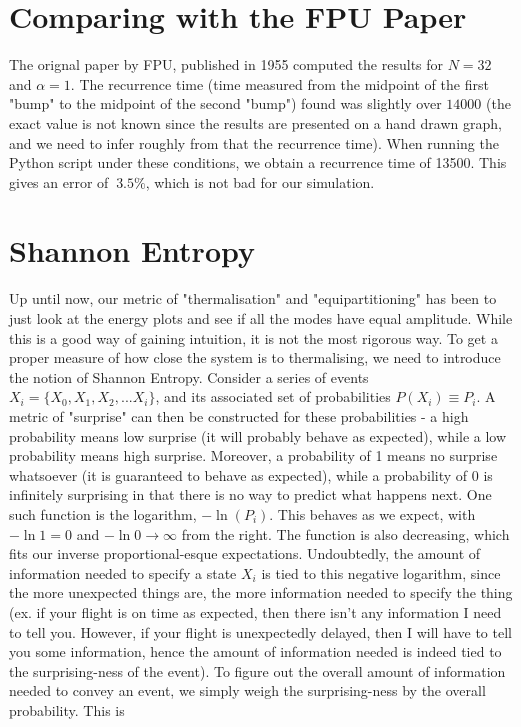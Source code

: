 \documentclass{article}
\begin{document}
\section{Comparing with the FPU Paper}
The orignal paper by FPU, published in 1955 computed the results for 
$N=32$ and $\alpha=1$. The recurrence time (time measured from the midpoint of 
the first "bump" to the midpoint of the second "bump") found was slightly over 
$14000$ (the exact value is not known since the results are presented
 on a hand drawn graph, and we need to infer roughly from that the recurrence time). When running the Python script 
under these conditions, we obtain a recurrence time of 13500. This gives an error of 
$~3.5\%$, 
which is not bad for our simulation. 
\section{Shannon Entropy}
Up until now, our metric of "thermalisation" and "equipartitioning" has been to just 
look at the energy plots and see if all the modes have equal amplitude. While this 
is a good way of gaining intuition, it is not the most rigorous way. To get a proper measure of how close the system is to thermalising, we need to introduce the notion 
of Shannon Entropy. Consider a series of events $X_i=\{X_0,X_1,X_2,...X_i\}$, and its associated set of 
probabilities $P(X_i)\equiv P_i$. A metric of "surprise" can then be constructed for these 
probabilities - a high probability means low surprise (it will probably behave as expected), 
while a low probability means high surprise. Moreover, a probability of 1 means no surprise whatsoever (it is guaranteed to behave as expected), 
while a probability of 0 is infinitely surprising in that there is no way to predict what happens next. One such function is the 
logarithm, $-\ln (P_i)$. This behaves as we expect, with $-\ln1=0$ and $-\ln0\to\infty$ from the right. The function 
is also decreasing, which fits our inverse proportional-esque expectations. Undoubtedly, 
the amount of information needed to specify a state $X_i$ is tied to this negative logarithm, since 
the more unexpected things are, the more information needed to specify the thing (ex. if your flight is on time as expected, 
then there isn't any information I need to tell you. However, if your flight is unexpectedly delayed, 
then I will have to tell you some information, hence the amount of information needed is indeed tied to 
the surprising-ness of the event). To figure out the overall amount of information needed 
to convey an event, we simply weigh the surprising-ness by the overall probability. This is 
\end{document}

